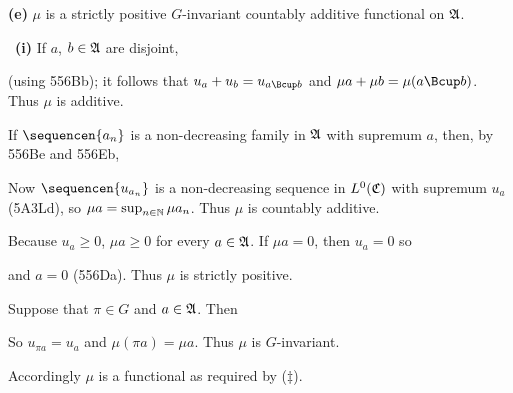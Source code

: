 {\medskip

{\bf (e)} $\mu$ is a strictly positive $G$-invariant
countably additive functional on $\frak A$.

\medskip

\Prf\ {\bf (i)} If $a$, $b\in\frak A$ are disjoint,


\noindent (using 556Bb);  it follows that $u_a+u_b=u_{a\Bcup b}$ and
$\mu a+\mu b=\mu(a\Bcup b)$.   Thus $\mu$ is additive.

\medskip

 If $\sequencen{a_n}$ is a
non-decreasing family in $\frak A$ with supremum $a$, then, by 556Be and
556Eb,


\noindent Now $\sequencen{u_{a_n}}$ is a non-decreasing sequence in
$L^0(\frak C)$ with supremum $u_a$ (5A3Ld), so
$\mu a=\sup_{n\in\Bbb N}\mu a_n$.   Thus $\mu$ is countably additive.

 Because $u_a\ge 0$, $\mu a\ge 0$ for every $a\in\frak A$.
If $\mu a=0$, then $u_a=0$ so


\noindent and $a=0$ (556Da).   Thus $\mu$ is strictly positive.

\medskip

 Suppose that $\pi\in G$ and $a\in\frak A$.   Then


\noindent So $u_{\pi a}=u_a$ and $\mu(\pi a)=\mu a$.   Thus $\mu$ is
$G$-invariant.\ \Qed

Accordingly $\mu$ is a functional as required by ($\ddagger$).
}%

